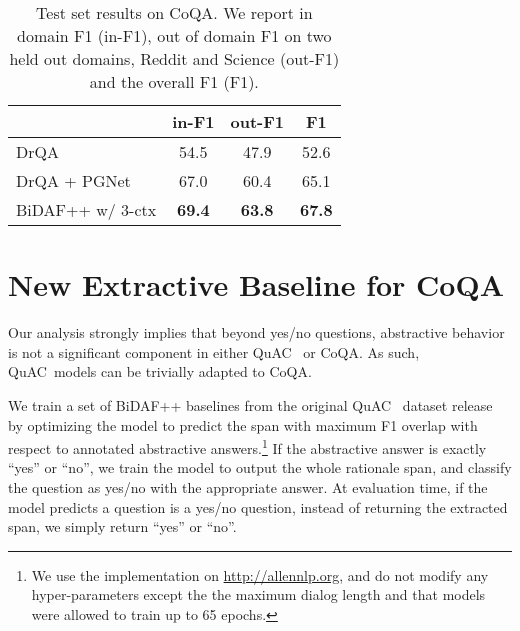 \documentclass[11pt,a4paper]{article}
\newcommand{\quact}[0]{QuAC}
\newcommand{\coqa}[0]{CoQA}
\begin{document}
\begin{table}[t]
 \small

    \centering
    \begin{tabular}{l|c|c|c}
    
     & in-F1 & out-F1 & F1  \\
    \midrule
    DrQA & 54.5 & 47.9 & 52.6\\
    DrQA + PGNet & 67.0 & 60.4 & 65.1 \\
    BiDAF++ w/ 3-ctx & {\bf 69.4} & {\bf 63.8} & {\bf 67.8} \\
    \end{tabular}
        \vspace{-7pt}
    \caption{Test set results on \coqa. We report in domain F1 (in-F1), out of domain F1 on two held out domains, Reddit and Science (out-F1) and the overall F1 (F1).  }
            \vspace{-7pt}

    \label{tab:coqa_test}
\end{table}
\section{New Extractive Baseline for \coqa}
\label{sec:baseline}
Our analysis strongly implies that beyond yes/no questions, abstractive behavior is not a significant component in either \quact~ or \coqa. As such, \quact~models can be trivially adapted to \coqa. 

We train a set of BiDAF++ baselines from the original \quact~ dataset release~\cite{ChoiQuAC2018} by optimizing the model to predict the span with maximum F1 overlap with respect to annotated abstractive answers.\footnote{We use the implementation on \url{http://allennlp.org}, and do not modify any hyper-parameters except the the maximum dialog length and that models were allowed to train up to 65 epochs.} 
If the abstractive answer is exactly ``yes'' or ``no'', we train the model to output the whole rationale span, and classify the question as yes/no with the appropriate answer. 
At evaluation time, if the model predicts a question is a yes/no question, instead of returning the extracted span, we simply return ``yes'' or ``no''.  
\end{document}
